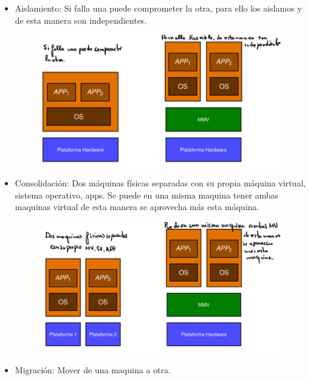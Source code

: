 \documentclass[12pt, twoside, openright]{report} %
\begin{document}
    \begin{itemize}
    \item
      Aislamiento: Si falla una puede comprometer la otra, para ello los
      aislamos y de esta manera son independientes.
      \begin{figure}[H]
        {\includegraphics[scale=.3]{Untitled 33.png}}
      \end{figure}
    \item
      Consolidación: Dos máquinas físicas separadas con su propia
      máquina virtual, sistema operativo, apps. Se puede en una misma
      maquina tener ambas maquinas virtual de esta manera se aprovecha
      más esta máquina.
      \begin{figure}[H]
        {\includegraphics[scale=.3]{Untitled 34.png}}
      \end{figure}
    \item
      Migración: Mover de una maquina a otra.
      \begin{figure}[H]

\end{figure}
\end{itemize}
\end{document}
